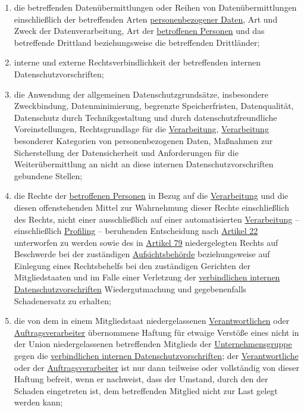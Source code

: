 \begin{enumerate}
\begin{enumerate}
    \item die betreffenden Datenübermittlungen oder Reihen von Datenübermittlungen einschließlich der betreffenden
     Arten
     \hyperref[itm:04-1]{personenbezogener Daten}, Art und Zweck der Datenverarbeitung, Art der \hyperref[itm:04-1]
      {betroffenen Personen} und das betreffende Drittland beziehungsweise die betreffenden Drittländer;
    \label{itm:47-2b}

    \item interne und externe Rechtsverbindlichkeit der betreffenden internen Datenschutzvorschriften;
    \label{itm:47-2c}

    \item die Anwendung der allgemeinen Datenschutzgrundsätze, insbesondere Zweckbindung, Datenminimierung, begrenzte
     Speicherfristen, Datenqualität, Datenschutz durch Technikgestaltung und durch datenschutzfreundliche
     Voreinstellungen, Rechtsgrundlage für die \hyperref[itm:04-2]{Verarbeitung}, \hyperref[itm:04-2]
     {Verarbeitung} besonderer Kategorien von personenbezogenen Daten, Maßnahmen zur Sicherstellung der Datensicherheit
     und Anforderungen für die Weiterübermittlung an nicht an diese internen Datenschutzvorschriften gebundene
     Stellen;
    \label{itm:47-2d}

    \item die Rechte der \hyperref[itm:04-1]{betroffenen Personen} in Bezug auf die \hyperref[itm:04-2]
     {Verarbeitung} und die diesen offenstehenden Mittel zur Wahrnehmung dieser Rechte einschließlich des Rechts, nicht
     einer ausschließlich auf einer automatisierten
     \hyperref[itm:04-2]{Verarbeitung} -- einschließlich \hyperref[itm:04-4]{Profiling} -- beruhenden Entscheidung
      nach \hyperref[ch:22]{Artikel 22} unterworfen zu werden sowie des in \hyperref[ch:79]{Artikel 79} niedergelegten
      Rechts auf Beschwerde bei der zuständigen
     \hyperref[itm:04-21]{Aufsichtsbehörde} beziehungsweise auf Einlegung eines Rechtsbehelfs bei den zuständigen
      Gerichten der Mitgliedstaaten und im Falle einer Verletzung der \hyperref[itm:04-20]{verbindlichen internen
      Datenschutzvorschriften} Wiedergutmachung und gegebenenfalls Schadenersatz zu erhalten;
    \label{itm:47-2e}

    \item die von dem in einem Mitgliedstaat niedergelassenen \hyperref[itm:04-7]{Verantwortlichen} oder \hyperref
     [itm:04-8]{Auftragsverarbeiter} übernommene Haftung für etwaige Verstöße eines nicht in der Union niedergelassenen
     betreffenden Mitglieds der
     \hyperref[itm:04-19]{Unternehmensgruppe} gegen die \hyperref[itm:04-20]{verbindlichen internen
      Datenschutzvorschriften}; der \hyperref[itm:04-7]{Verantwortliche} oder der
     \hyperref[itm:04-8]{Auftragsverarbeiter} ist nur dann teilweise oder vollständig von dieser Haftung befreit, wenn
      er nachweist, dass der Umstand, durch den der Schaden eingetreten ist, dem betreffenden Mitglied nicht zur Last
      gelegt werden kann;
    \label{itm:47-2f}


\end{enumerate}
\end{enumerate}
